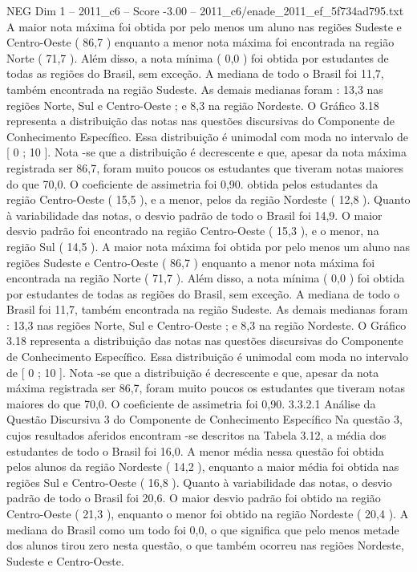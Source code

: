 \begin{textsample}{NEG Dim 1 – 2011\_c6 – Score -3.00 – 2011\_c6/enade\_2011\_ef\_5f734ad795.txt}
A maior nota máxima foi obtida por pelo menos um aluno nas regiões Sudeste e Centro-Oeste ( 86,7 ) enquanto a menor nota máxima foi encontrada na região Norte ( 71,7 ).
Além disso, a nota mínima ( 0,0 ) foi obtida por estudantes de todas as regiões do Brasil, sem exceção.
A mediana de todo o Brasil foi 11,7, também encontrada na região Sudeste.
As demais medianas foram : 13,3 nas regiões Norte, Sul e Centro-Oeste ; e 8,3 na região Nordeste.
O Gráfico 3.18 representa a distribuição das notas nas questões discursivas do Componente de Conhecimento Específico.
Essa distribuição é unimodal com moda no intervalo de [ 0 ; 10 ].
Nota -se que a distribuição é decrescente e que, apesar da nota máxima registrada ser 86,7, foram muito poucos os estudantes que tiveram notas maiores do que 70,0.
O coeficiente de assimetria foi 0,90. obtida pelos estudantes da região Centro-Oeste ( 15,5 ), e a menor, pelos da região Nordeste ( 12,8 ).
Quanto à variabilidade das notas, o desvio padrão de todo o Brasil foi 14,9.
O maior desvio padrão foi encontrado na região Centro-Oeste ( 15,3 ), e o menor, na região Sul ( 14,5 ).
A maior nota máxima foi obtida por pelo menos um aluno nas regiões Sudeste e Centro-Oeste ( 86,7 ) enquanto a menor nota máxima foi encontrada na região Norte ( 71,7 ).
Além disso, a nota mínima ( 0,0 ) foi obtida por estudantes de todas as regiões do Brasil, sem exceção.
A mediana de todo o Brasil foi 11,7, também encontrada na região Sudeste.
As demais medianas foram : 13,3 nas regiões Norte, Sul e Centro-Oeste ; e 8,3 na região Nordeste.
O Gráfico 3.18 representa a distribuição das notas nas questões discursivas do Componente de Conhecimento Específico.
Essa distribuição é unimodal com moda no intervalo de [ 0 ; 10 ].
Nota -se que a distribuição é decrescente e que, apesar da nota máxima registrada ser 86,7, foram muito poucos os estudantes que tiveram notas maiores do que 70,0.
O coeficiente de assimetria foi 0,90. 3.3.2.1 Análise da Questão Discursiva 3 do Componente de Conhecimento Específico Na questão 3, cujos resultados aferidos encontram -se descritos na Tabela 3.12, a média dos estudantes de todo o Brasil foi 16,0.
A menor média nessa questão foi obtida pelos alunos da região Nordeste ( 14,2 ), enquanto a maior média foi obtida nas regiões Sul e Centro-Oeste ( 16,8 ).
Quanto à variabilidade das notas, o desvio padrão de todo o Brasil foi 20,6.
O maior desvio padrão foi obtido na região Centro-Oeste ( 21,3 ), enquanto o menor foi obtido na região Nordeste ( 20,4 ).
A mediana do Brasil como um todo foi 0,0, o que significa que pelo menos metade dos alunos tirou zero nesta questão, o que também ocorreu nas regiões Nordeste, Sudeste e Centro-Oeste.

\end{textsample}
